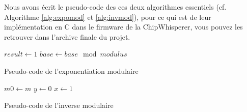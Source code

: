 Nous avons écrit le pseudo-code des ces deux algorithmes essentiels (cf. Algorithme \ref{alg:expomod} et \ref{alg:invmod}), pour ce qui est de leur implémentation en C dans le firmware de la ChipWhisperer, vous pouvez les retrouver dans l'archive finale du projet.

\medskip
\begin{algorithm}[p]
\SetAlgoLined
{}
$result \leftarrow 1$\;
$base \leftarrow base \mod modulus$\;
\;
\caption{Pseudo-code de l'exponentiation modulaire}
\label{alg:expomod}
\end{algorithm}
\medskip

\begin{algorithm}[p]
\SetAlgoLined
{}
$m0 \leftarrow m$\;
$y \leftarrow 0$\;
$x \leftarrow 1$\;
\;
\caption{Pseudo-code de l'inverse modulaire}
\label{alg:invmod}
\end{algorithm}

